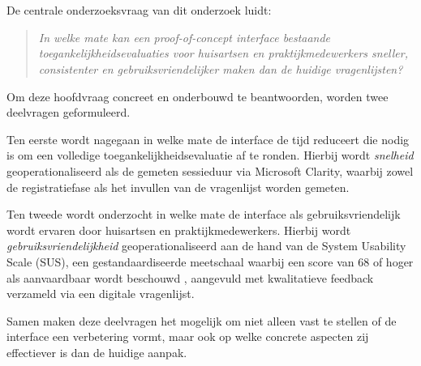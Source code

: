 \section{}%
\label{sec:onderzoeksvraag}


De centrale onderzoeksvraag van dit onderzoek luidt:

\begin{quote}
  \textit{In welke mate kan een proof-of-concept interface bestaande
  toegankelijkheidsevaluaties voor huisartsen en praktijkmedewerkers sneller, consistenter
  en gebruiksvriendelijker maken dan de huidige vragenlijsten?}
\end{quote}

Om deze hoofdvraag concreet en onderbouwd te beantwoorden, worden twee deelvragen geformuleerd.
\medskip

Ten eerste wordt nagegaan in welke mate de interface de tijd reduceert
die nodig is om een volledige toegankelijkheidsevaluatie af te ronden. Hierbij wordt
\textit{snelheid} geoperationaliseerd als de gemeten sessieduur via Microsoft Clarity,
waarbij zowel de registratiefase als het invullen van de vragenlijst worden gemeten.
\medskip

Ten tweede wordt onderzocht in welke mate de interface als gebruiksvriendelijk wordt
ervaren door huisartsen en praktijkmedewerkers. Hierbij wordt \textit{gebruiksvriendelijkheid}
geoperationaliseerd aan de hand van de System Usability Scale (SUS), een gestandaardiseerde
meetschaal waarbij een score van 68 of hoger als aanvaardbaar wordt beschouwd
\autocite{Brooke1995}, aangevuld met kwalitatieve feedback verzameld via een digitale vragenlijst.
\medskip

Samen maken deze deelvragen het mogelijk om niet alleen vast te stellen of de interface
een verbetering vormt, maar ook op welke concrete aspecten zij effectiever is dan de
huidige aanpak.

\section{}%
\label{sec:onderzoeksdoelstelling}

